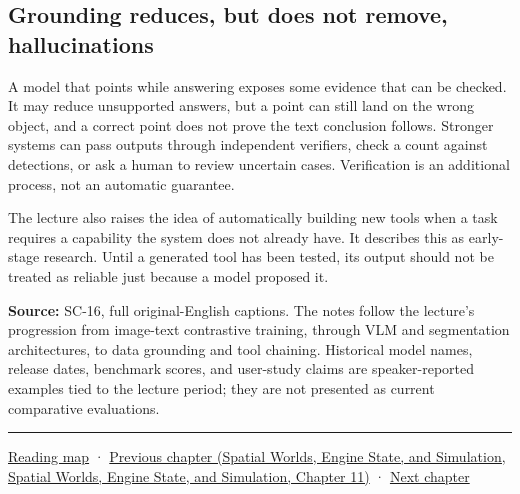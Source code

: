 \subsection{Grounding reduces, but does not remove, hallucinations}\label{04-visual-computing-ii-ch031-grounding-reduces-but-does-not-remove-hallucinations}

A model that points while answering exposes some evidence that can be checked. It may reduce unsupported answers, but a point can still land on the wrong object, and a correct point does not prove the text conclusion follows. Stronger systems can pass outputs through independent verifiers, check a count against detections, or ask a human to review uncertain cases. Verification is an additional process, not an automatic guarantee.

The lecture also raises the idea of automatically building new tools when a task requires a capability the system does not already have. It describes this as early-stage research. Until a generated tool has been tested, its output should not be treated as reliable just because a model proposed it.

\textbf{Source:} SC-16, full original-English captions. The notes follow the lecture's progression from image-text contrastive training, through VLM and segmentation architectures, to data grounding and tool chaining. Historical model names, release dates, benchmark scores, and user-study claims are speaker-reported examples tied to the lecture period; they are not presented as current comparative evaluations.

\begin{center}\rule{0.5\linewidth}{0.5pt}\end{center}

\hyperref[volume-reading-map]{Reading map} · \href{../05-Spatial-Worlds-Engine-State-and-Simulation/main.pdf\#nameddest=04-visual-computing-ii-ch030-mesh-operators-boundaries-and-diffusion}{Previous chapter (Spatial Worlds, Engine State, and Simulation, Spatial Worlds, Engine State, and Simulation, Chapter 11)} · \hyperref[04-visual-computing-ii-ch032-pose-estimation-and-robust-fitting]{Next chapter}
